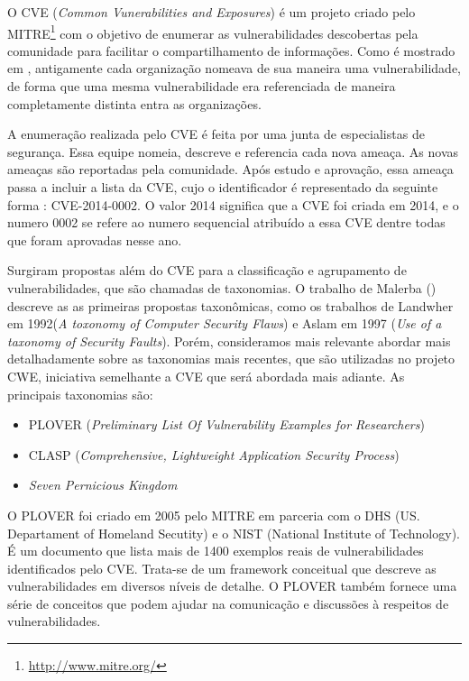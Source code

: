%

O CVE (\emph{Common Vunerabilities and Exposures}) é um projeto criado pelo MITRE\footnote{\url{http://www.mitre.org/}} com o objetivo de enumerar as vulnerabilidades descobertas pela comunidade para facilitar o compartilhamento de informações. Como é mostrado em \cite{cve2001martin}, antigamente cada organização nomeava de sua maneira uma vulnerabilidade, de forma que uma mesma vulnerabilidade era referenciada de maneira completamente distinta entra as organizações. 

%

A enumeração realizada pelo CVE é feita por uma junta de especialistas 	de segurança. Essa equipe nomeia, descreve e referencia cada nova ameaça. As novas ameaças são reportadas pela comunidade. Após estudo e aprovação, essa ameaça passa a incluir a lista da CVE, cujo o identificador é representado da seguinte forma : CVE-2014-0002. O valor 2014 significa que a CVE foi criada em 2014, e o numero 0002 se refere ao numero sequencial atribuído a essa CVE dentre todas que foram aprovadas nesse ano.

%

Surgiram propostas além do CVE para a classificação e agrupamento de vulnerabilidades, que são chamadas de taxonomias. O trabalho de Malerba (\citeyear{malerba2010}) descreve as as primeiras propostas taxonômicas, como os trabalhos de Landwher em 1992(\emph{A toxonomy of Computer Security Flaws}) e Aslam em 1997 (\emph{Use of  a taxonomy of Security Faults}). Porém, consideramos mais relevante abordar mais detalhadamente sobre as taxonomias mais recentes, que são utilizadas no projeto CWE, iniciativa semelhante a CVE que será abordada mais adiante. As principais taxonomias são:

%

\begin{itemize}
\item PLOVER (\emph{Preliminary List Of Vulnerability Examples for Researchers})
\item CLASP (\emph{Comprehensive, Lightweight Application Security Process})
\item \emph{Seven Pernicious Kingdom}
\end{itemize}

%

O PLOVER foi criado em 2005 pelo MITRE em parceria com o DHS (US. Departament of Homeland Secutity) e o NIST (National Institute of Technology). É um documento que lista mais de 1400 exemplos reais de vulnerabilidades identificados pelo CVE. Trata-se de um framework conceitual que descreve as vulnerabilidades em diversos níveis de detalhe. O PLOVER também fornece uma série de conceitos que podem ajudar na comunicação e discussões à respeitos de vulnerabilidades.

